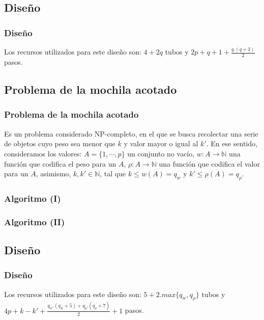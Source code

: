 \documentclass[12pt]{beamer}
\begin{document}
 \begin{frame}
    \subsection{Diseño}
    \frametitle{Diseño}
    Los recursos utilizados para este diseño son: $4+2q$ tubos y $2p+q+1+\frac{q.(q+3)}{2}$ pasos.
 \end{frame}
 \begin{frame}
    \section{Problema de la mochila acotado}
    \frametitle{Problema de la mochila acotado}
    Es un problema considerado NP-completo, en el que se busca recolectar una serie de objetos cuyo peso sea menor que $k$ y valor mayor o igual al $k'$. En ese sentido, consideramos los valores: $A=\{1,\cdots,p\}$ un conjunto no vacío, $w:A\rightarrow\mathbb{N}$ una función que codifica el peso para un $A$, $\rho:A\rightarrow\mathbb{N}$ una función que codifica el valor para un $A$, asimismo, $k,k'\in\mathbb{N}$, tal que $k\leq w(A)=q_w$ y $k'\leq \rho(A)=q_\rho$.
 \end{frame}
 \begin{frame}
     \frametitle{Algoritmo (I)}
    \begin{algorithmic}[1]
        \State{$\cdots$}
        \EndProcedure
    \end{algorithmic}
 \end{frame}
 \begin{frame}
     \frametitle{Algoritmo (II)}
    \begin{algorithmic}[1]
        \State{$\cdots$}
        \EndFor
        \EndProcedure
    \end{algorithmic}
 \end{frame}
 \begin{frame}
    \subsection{Diseño}
    \frametitle{Diseño}
    Los recursos utilizados para este diseño son: $5+2 . max\{q_w,q_\rho\}$ tubos y $4p+ k-k'+\frac{q_w.(q_w+5)+q_\rho.(q_\rho+7)}{2}+1$ pasos.
 \end{frame}
\end{document}
